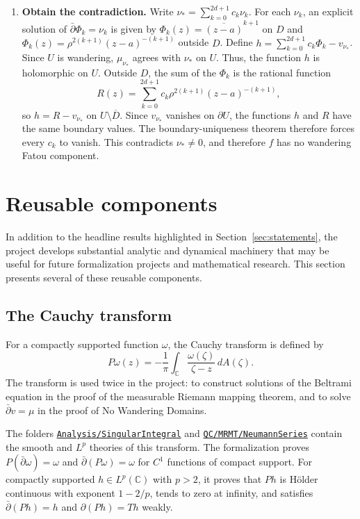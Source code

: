 \documentclass[letterpaper]{amsart}
\numberwithin{equation}{section}
\numberwithin{figure}{section}
\theoremstyle{plain}
\theoremstyle{definition}
\newcommand{\C}{\mathbb{C}}
\let\lean\nolinkurl
\newcommand{\leanfolder}[1]{\href{https://github.com/will1491/no-wandering-domains/tree/1a39faf/NoWanderingDomains/#1}{\lean{#1}}}
\begin{document}
\begin{enumerate}[label=\textbf{Step \arabic*.},leftmargin=*]
\item \textbf{Obtain the contradiction.} Write $\nu_*=\sum_{k=0}^{2d+1}c_k\nu_k$. For each $\nu_k$, an explicit solution of $\bar\partial\Phi_k=\nu_k$ is given by $\Phi_k(z)=\overline{(z-a)}^{k+1}$ on $D$ and $\Phi_k(z)=\rho^{2(k+1)}(z-a)^{-(k+1)}$ outside $D$. Define $h=\sum_{k=0}^{2d+1}c_k\Phi_k-v_{\nu_*}$.
Since $U$ is wandering, $\mu_{\nu_*}$ agrees with $\nu_*$ on $U$. 
Thus, the function $h$ is holomorphic on $U$. Outside $D$, the sum of the $\Phi_k$ is the rational function
\[
  R(z)=\sum_{k=0}^{2d+1}c_k\rho^{2(k+1)}(z-a)^{-(k+1)},
\]
so $h=R-v_{\nu_*}$ on $U\setminus\overline D$. Since $v_{\nu_*}$ vanishes on $\partial U$, the functions $h$ and $R$ have the same boundary values. The boundary-uniqueness theorem therefore forces every $c_k$ to vanish. This contradicts $\nu_*\neq0$, and therefore $f$ has no wandering Fatou component.
\end{enumerate}

\section{Reusable components}
\label{sec:components}

In addition to the headline results highlighted in Section~\ref{sec:statements}, the project develops substantial analytic and dynamical machinery that may be useful for future formalization projects and mathematical research. This section presents several of these reusable components.

\subsection{The Cauchy transform}

For a compactly supported function $\omega$, the Cauchy transform is defined by
\[
  P\omega(z)=-\frac{1}{\pi}\int_{\C}
    \frac{\omega(\zeta)}{\zeta-z}\,dA(\zeta).
\]
The transform is used twice in the project: to construct solutions of the Beltrami equation in the proof of the measurable Riemann mapping theorem, and to solve $\bar\partial v=\mu$ in the proof of No Wandering Domains.

The folders \leanfolder{Analysis/SingularIntegral} and \leanfolder{QC/MRMT/NeumannSeries} contain the smooth and $L^p$ theories of this transform. The formalization proves $P(\bar\partial\omega)=\omega$ and $\bar\partial(P\omega)=\omega$ for $C^1$ functions of compact support. For compactly supported $h\in L^p(\C)$ with $p>2$, it proves that $Ph$ is H\"older continuous with exponent $1-2/p$, tends to zero at infinity, and satisfies $\bar\partial(Ph)=h$ and $\partial(Ph)=Th$ weakly.
\end{document}
